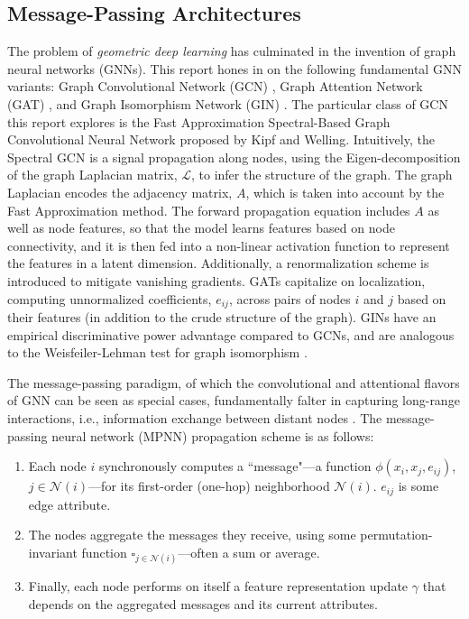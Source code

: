 \documentclass[11pt]{article}
\begin{document}
\subsection{Message-Passing Architectures}
The problem of \textit{geometric deep learning} \cite{https://doi.org/10.48550/arxiv.2104.13478} has culminated in the invention of graph neural networks (GNNs). This report hones in on the following fundamental GNN variants: Graph Convolutional Network (GCN) \cite{https://doi.org/10.48550/arxiv.1609.02907}, Graph Attention Network (GAT) \cite{https://doi.org/10.48550/arxiv.1710.10903}, and Graph Isomorphism Network (GIN) \cite{xu2018how}. The particular class of GCN this report explores is the Fast Approximation Spectral-Based Graph Convolutional Neural Network proposed by Kipf and Welling. Intuitively, the Spectral GCN is a signal propagation along nodes, using the Eigen-decomposition of the graph Laplacian matrix, $\mathcal{L}$, to infer the structure of the graph. The graph Laplacian encodes the adjacency matrix, $A$, which is taken into account by the Fast Approximation method. The forward propagation equation includes $A$ as well as node features, so that the model learns features based on node connectivity, and it is then fed into a non-linear activation function \cite{8436869} to represent the features in a latent dimension. Additionally, a renormalization scheme is introduced to mitigate vanishing gradients. GATs capitalize on localization, computing unnormalized coefficients, $e_{ij}$, across pairs of nodes $i$ and $j$ based on their features (in addition to the crude structure of the graph). GINs have an empirical discriminative power advantage compared to GCNs, and are analogous to the Weisfeiler-Lehman test for graph isomorphism \cite{https://doi.org/10.48550/arxiv.1101.5211}. 


The message-passing paradigm, of which the convolutional and attentional flavors of GNN can be seen as special cases, fundamentally falter in capturing long-range interactions, i.e., information exchange between distant nodes \cite{https://doi.org/10.48550/arxiv.2206.08164}. The message-passing neural network (MPNN) propagation scheme \cite{https://doi.org/10.48550/arxiv.1704.01212} is as follows:

\begin{enumerate}
    \item Each node $i$ synchronously computes a “message"---a function $\phi(x_i, x_j, e_{ij})$, $j\in\mathcal{N}(i)$---for its first-order (one-hop) neighborhood $\mathcal{N}(i)$. $e_{ij}$ is some edge attribute.
    \item The nodes aggregate the messages they receive, using some permutation-invariant function  $\square_{j\in\mathcal{N}(i)}$---often a sum or average.
    \item Finally, each node performs on itself a feature representation update $\gamma$ that depends on the aggregated messages and its current attributes.
\end{enumerate}
\end{document}
